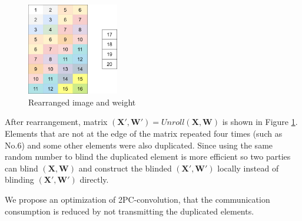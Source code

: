\documentclass[letterpaper]{article} %
\begin{document}
    \begin{figure}[htbp]
        \centering
        \includegraphics[width=4cm]{new_unrolling2.png}
        \caption{Rearranged image and weight}
        \label{rearrangement of image and weight}
    \end{figure}

    After rearrangement, matrix $(\mathbf{X}',\mathbf{W}')=Unroll(\mathbf{X},\mathbf{W})$
    is shown in Figure \ref{rearrangement of image and weight}.
    Elements that are not at the edge of the matrix repeated four times (such as No.6)
    and some other elements were also duplicated.
    Since using the same random number to blind the duplicated element
    is more efficient so two parties can blind $(\mathbf{X},\mathbf{W})$ and
    construct the blinded $(\mathbf{X}',\mathbf{W}')$ locally instead of blinding $(\mathbf{X}',\mathbf{W}')$ directly.


    We propose an optimization of 2PC-convolution,
    that the communication consumption is reduced by
    not transmitting the duplicated elements.
\end{document}
